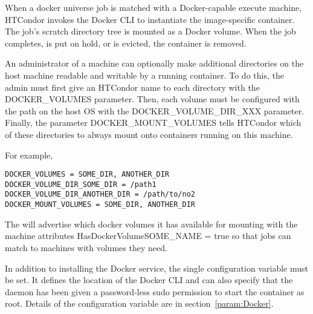 When a docker universe job is matched with a Docker-capable
execute machine,
HTCondor invokes the Docker CLI to instantiate the image-specific container.
The job's scratch directory tree is mounted as a Docker volume.
When the job completes, is put on hold, or is evicted, the container is removed.

An administrator of a machine can optionally make additional directories
on the host machine readable and writable by a running container.
To do this, the admin must first give an HTCondor name to each directory
with the DOCKER\_VOLUMES parameter.  Then, each volume must be configured
with the path on the host OS with the DOCKER\_VOLUME\_DIR\_XXX parameter.
Finally, the parameter DOCKER\_MOUNT\_VOLUMES tells HTCondor which of
these directories to always mount onto containers running on this machine.

For example,
\begin{verbatim}
DOCKER_VOLUMES = SOME_DIR, ANOTHER_DIR
DOCKER_VOLUME_DIR_SOME_DIR = /path1
DOCKER_VOLUME_DIR_ANOTHER_DIR = /path/to/no2
DOCKER_MOUNT_VOLUMES = SOME_DIR, ANOTHER_DIR
\end{verbatim}

The  will advertise which docker volumes it has available 
for mounting with the machine attributes HasDockerVolumeSOME\_NAME = true
so that jobs can match to machines with volumes they need.

In addition to installing the Docker service, 
the single configuration variable  must be set.
It defines the location of the Docker CLI and can also specify that
the  daemon has been given a password-less sudo
permission to start the container as root.
Details of the  configuration variable are in
section~\ref{param:Docker}.

